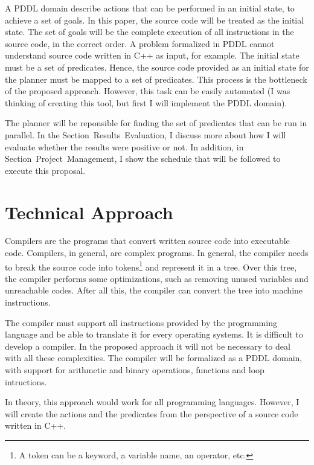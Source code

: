 \documentclass[letterpaper]{article}
\begin{document}
A PDDL domain describe actions that can be performed in an initial state, to achieve a set of goals. In this paper, the source code will be treated as the initial state. The set of goals will be the complete execution of all instructions in the source code, in the correct order. A problem formalized in PDDL cannot understand source code written in C++ as input, for example. The initial state must be a set of predicates. Hence, the source code provided as an initial state for the planner must be mapped to a set of predicates. This process is the bottleneck of the proposed approach. However, this task can be easily automated (I was thinking of creating this tool, but first I will implement the PDDL domain).

The planner will be reponsible for finding the set of predicates that can be run in parallel. In the Section~Results~Evaluation, I discuss more about how I will evaluate whether the results were positive or not. In addition, in Section~Project~Management, I show the schedule that will be followed to execute this proposal.


\section{Technical Approach}

Compilers are the programs that convert written source code into executable code. Compilers, in general, are complex programs. In general, the compiler needs to break the source code into tokens\footnote{A token can be a keyword, a variable name, an operator, etc.} and represent it in a tree. Over this tree, the compiler performs some optimizations, such as removing unused variables and unreachable codes. After all this, the compiler can convert the tree into machine instructions.

The compiler must support all instructions provided by the programming language and be able to translate it for every operating systems. It is difficult to develop a compiler. In the proposed approach it will not be necessary to deal with all these complexities. The compiler will be formalized as a PDDL domain, with support for arithmetic and binary operations, functions and loop intructions.

In theory, this approach would work for all programming languages. However, I will create the actions and the predicates from the perspective of a source code written in C++.
\end{document}
